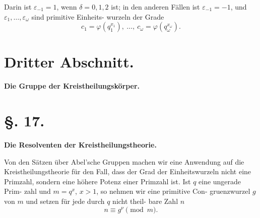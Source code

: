 \documentclass[12pt,a4paper]{article}
\theoremstyle{plain}
\theoremstyle{definition}
\theoremstyle{remark}
\begin{document}
Darin ist $\varepsilon_{-1} = 1$, wenn $\delta = 0, 1, 2$ ist; in den anderen
Fällen ist $\varepsilon_{-1} = -1$, und $\varepsilon_1, \ldots, \varepsilon_\omega$ sind primitive Einheits-
wurzeln der Grade
\[
c_1 = \varphi(q_1^{x_1}), \ \ldots, \ c_\omega = \varphi(q_\omega^{x_\omega}).
\]


\section*{Dritter Abschnitt.}
\begin{center}
\Large\textbf{Die Gruppe der Kreistheilungskörper.}
\end{center}

\section*{\S. 17.}
\begin{center}
\textbf{Die Resolventen der Kreistheilungstheorie.}
\end{center}

Von den Sätzen über Abel'sche Gruppen machen wir eine
Anwendung auf die Kreistheilungstheorie für den Fall, dass der
Grad der Einheitswurzeln nicht eine Primzahl, sondern eine
höhere Potenz einer Primzahl ist. Ist $q$ eine ungerade Prim-
zahl und $m = q^x$, $x > 1$, so nehmen wir eine primitive Con-
gruenzwurzel $g$ von $m$ und setzen für jede durch $q$ nicht theil-
bare Zahl $n$
\begin{equation}\tag{1}
n \equiv g^\nu \pmod{m}.
\end{equation}
\end{document}
